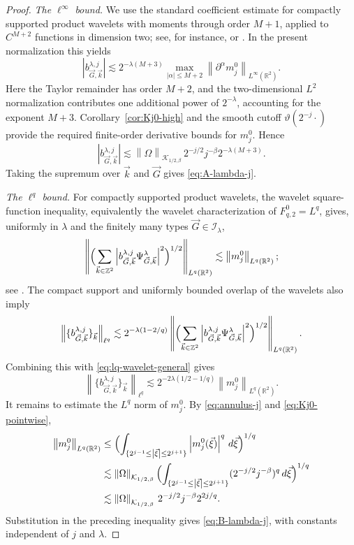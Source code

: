 \documentclass[11pt]{amsart}
\theoremstyle{remark}
\numberwithin{equation}{section}
\newcommand{\R}{\mathbb R}
\newcommand{\cK}{\mathcal K}
\newcommand{\cI}{\mathcal I}
\newcommand{\norm}[1]{\left\lVert #1\right\rVert}
\newcommand{\abs}[1]{\left\lvert #1\right\rvert}
\newcommand{\p}{\partial}
\begin{document}
	\begin{proof}
		\emph{The \(\ell^\infty\) bound.}
		We use the standard coefficient estimate for compactly supported product
		wavelets with moments through order \(M+1\), applied to \(C^{M+2}\) functions in
		dimension two; see, for instance, \cite[Chapter~VI]{Meyer_1992} or
		\cite[Chapter~1]{Triebel_2006}. In the present normalization this yields
		\[
		\abs{b_{\vec G,\vec k}^{\lambda,j}}
		\lesssim
		2^{-\lambda(M+3)}
		\max_{\abs{\alpha}\le M+2}
		\norm{\p^\alpha m_j^0}_{L^\infty(\R^2)}.
		\]
		Here the Taylor remainder has order \(M+2\), and the two-dimensional
		\(L^2\) normalization contributes one additional power of \(2^{-\lambda}\),
		accounting for the exponent \(M+3\). Corollary~\ref{cor:Kj0-high} and the smooth
		cutoff \(\vartheta(2^{-j}\cdot)\) provide the required finite-order derivative
		bounds for \(m_j^0\). Hence
		\[
		\abs{b_{\vec G,\vec k}^{\lambda,j}}
		\lesssim
		\norm{\Omega}_{\cK_{1/2,\beta}}\,2^{-j/2}j^{-\beta}2^{-\lambda(M+3)}.
		\]
		Taking the supremum over \(\vec k\) and \(\vec G\) gives
		\eqref{eq:A-lambda-j}.
		
		\smallskip
		\noindent\emph{The \(\ell^q\) bound.}
		For compactly supported product wavelets, the wavelet square-function
		inequality, equivalently the wavelet characterization of \(F^0_{q,2}=L^q\),
		gives, uniformly in \(\lambda\) and the finitely many types
		\(\vec G\in\cI_\lambda\),
		\begin{equation}\label{eq:lq-wavelet-general}
			\left\|\Bigl(\sum_{\vec k\in\mathbb Z^2}
			\abs{b_{\vec G,\vec k}^{\lambda,j}\Psi_{\vec G,\vec k}^\lambda}^2\Bigr)^{1/2}\right\|_{L^q(\R^2)}
			\lesssim
			\norm{m_j^0}_{L^q(\R^2)};
		\end{equation}
		see \cite[Chapter~1]{Triebel_2006}. The compact support and uniformly bounded
		overlap of the wavelets also imply
		\[
		\norm{\{b_{\vec G,\vec k}^{\lambda,j}\}_{\vec k}}_{\ell^q}
		\lesssim
		2^{-\lambda(1-2/q)}
		\left\|\Bigl(\sum_{\vec k\in\mathbb Z^2}
		\abs{b_{\vec G,\vec k}^{\lambda,j}\Psi_{\vec G,\vec k}^\lambda}^2\Bigr)^{1/2}\right\|_{L^q(\R^2)}.
		\]
		Combining this with \eqref{eq:lq-wavelet-general} gives
		\[
		\norm{\{b_{\vec G,\vec k}^{\lambda,j}\}_{\vec k}}_{\ell^q}
		\lesssim
		2^{-2\lambda(1/2-1/q)}\norm{m_j^0}_{L^q(\R^2)}.
		\]
		It remains to estimate the \(L^q\) norm of \(m_j^0\). By \eqref{eq:annulus-j} and
		\eqref{eq:Kj0-pointwise},
		\begin{align*}
			\norm{m_j^0}_{L^q(\R^2)}
			&\le
			\Bigl(\int_{\{2^{j-1}\le\abs{\vec\xi}\le2^{j+1}\}}
			\abs{m_j^0(\vec\xi)}^q\,d\vec\xi\Bigr)^{1/q}
			\\
			&\lesssim
			\norm{\Omega}_{\cK_{1/2,\beta}}
			\Bigl(\int_{\{2^{j-1}\le\abs{\vec\xi}\le2^{j+1}\}}
			(2^{-j/2}j^{-\beta})^q\,d\vec\xi\Bigr)^{1/q}
			\\
			&\lesssim
			\norm{\Omega}_{\cK_{1/2,\beta}}
			\,2^{-j/2}j^{-\beta}2^{2j/q}.
		\end{align*}
		Substitution in the preceding inequality gives
		\eqref{eq:B-lambda-j}, with constants independent of \(j\) and \(\lambda\).
	\end{proof}
	
\end{document}

